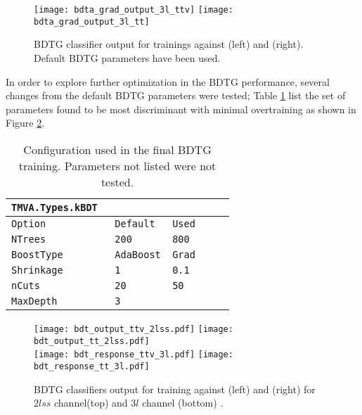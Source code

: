 \begin{figure} [!h]
  \centering
   \texttt{[image: bdta\_grad\_output\_3l\_ttv]}
   \texttt{[image: bdta\_grad\_output\_3l\_tt]}
\caption[BDTG classifier response. Default parameters.]{BDTG classifier output for trainings against \ttV (left) and \ttbar(right). Default BDTG  parameters have been used.}
\label{fig:bdtg_output_default}
\end{figure}

In order to explore further optimization in the BDTG performance, several changes from the default BDTG parameters were tested; Table \ref{tab:bdtsettings} list the set of parameters found to be most discriminant with minimal overtraining as shown in Figure \ref{fig:output_2lss}.  

\begin{table} [!h]
\centering
\begin{tabular}{lll}\hline
  \verb|TMVA.Types.kBDT                  | \\\hline
  \verb|Option            Default   Used |\\
  \verb|NTrees            200       800  |\\
  \verb|BoostType         AdaBoost  Grad | \\
  \verb|Shrinkage         1         0.1  | \\ 
  \verb|nCuts             20        50   | \\
  \verb|MaxDepth          3              | \\ \hline
\end{tabular}
\caption[Configuration used in the final BDTG training.]{Configuration used in the final BDTG training. Parameters not listed were not tested.}\label{tab:bdtsettings}
\end{table}

\begin{figure} [!h]
  \centering
   \texttt{[image: bdt\_output\_ttv\_2lss.pdf]}
   \texttt{[image: bdt\_output\_tt\_2lss.pdf]}\\
   \texttt{[image: bdt\_response\_ttv\_3l.pdf]}
   \texttt{[image: bdt\_response\_tt\_3l.pdf]}
\caption[BDTG classifier output.]{BDTG classifiers output for training against \ttV (left) and \ttbar(right) for $2lss$ channel(top) and $3l$ channel (bottom) .}
\label{fig:output_2lss}
\end{figure}

